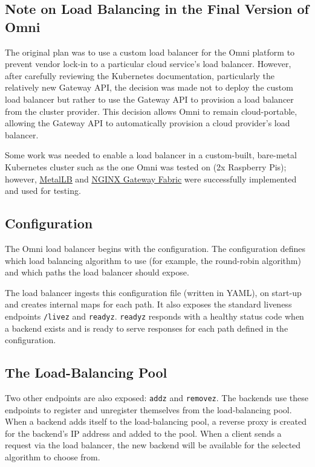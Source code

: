 \subsection{Note on Load Balancing in the Final Version of Omni}
The original plan was to use a custom load balancer for the Omni platform to prevent vendor lock-in to a particular cloud service's load balancer.
However, after carefully reviewing the Kubernetes documentation, particularly the relatively new Gateway API, the decision was made not to deploy the custom load balancer but rather to use the Gateway API to provision a load balancer from the cluster provider.
This decision allows Omni to remain cloud-portable, allowing the Gateway API to automatically provision a cloud provider's load balancer. 

Some work was needed to enable a load balancer in a custom-built, bare-metal Kubernetes cluster such as the one Omni was tested on (2x Raspberry Pis); however, \underline{\href{https://metallb.io}{MetalLB}} \nocite{metallb} and \underline{\href{https://docs.nginx.com/nginx-gateway-fabric/}{NGINX Gateway Fabric}} \nocite{nginxgatewayfabric} were successfully implemented and used for testing.

\subsection{Configuration}
The Omni load balancer begins with the configuration. The configuration defines which load balancing algorithm to use (for example, the round-robin algorithm) and which paths the load balancer should expose. 

The load balancer ingests this configuration file (written in YAML), on start-up and creates internal maps for each path.
It also exposes the standard liveness endpoints \verb|/livez| and \verb|readyz|. \verb|readyz| responds with a healthy status code when a backend exists and is ready to serve responses for each path defined in the configuration.

\subsection{The Load-Balancing Pool}
Two other endpoints are also exposed: \verb|addz| and \verb|removez|. The backends use these endpoints to register and unregister themselves from the load-balancing pool. 
When a backend adds itself to the load-balancing pool, a reverse proxy is created for the backend's IP address and added to the pool.
When a client sends a request via the load balancer, the new backend will be available for the selected algorithm to choose from.

